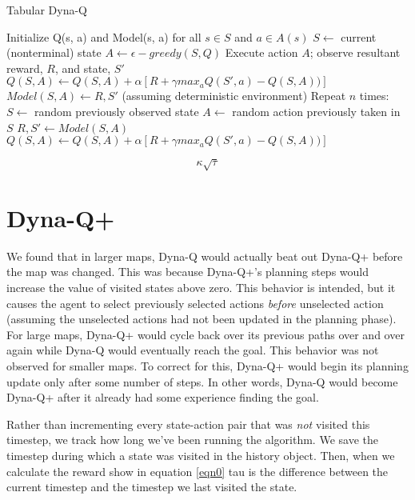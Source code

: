 \begin{algorithm}
    \caption{Tabular Dyna-Q}\label{alg:dynaq}
    \begin{algorithmic}
      \STATE Initialize Q(s, a) and Model(s, a) for all $s \in S$ and $a \in A(s)$
        \STATE $S \leftarrow$ current (nonterminal) state
        \STATE $A \leftarrow \epsilon-greedy(S,Q)$
        \STATE Execute action $A$; observe resultant reward, $R$, and state, $S'$
        \STATE $Q(S,A) \leftarrow Q(S,A) + \alpha[R + \gamma max_a Q(S',a) - Q(S,A))]$
        \STATE $Model(S,A) \leftarrow R,S'$ (assuming deterministic environment)
        \STATE Repeat $n$ times:
        \bindent
          \STATE $S \leftarrow$ random previously observed state
          \STATE $A \leftarrow$ random action previously taken in $S$
          \STATE $R,S' \leftarrow Model(S,A)$
          \STATE $Q(S,A) \leftarrow Q(S,A) + \alpha[R + \gamma max_a Q(S',a) - Q(S,A))]$
        \eindent
      \ENDWHILE
    \end{algorithmic}
  \end{algorithm}


\begin{equation}\label{eqn0}
    \kappa \sqrt{\tau}
\end{equation}


\section{Dyna-Q+}

We found that in larger maps, Dyna-Q would actually beat out Dyna-Q+ before the map was changed. This was because Dyna-Q+'s planning steps would increase the value of visited states above zero. This behavior is intended, but it causes the agent to select previously selected actions \textit{before} unselected action (assuming the unselected actions had not been updated in the planning phase). For large maps, Dyna-Q+ would cycle back over its previous paths over and over again while Dyna-Q would eventually reach the goal. This behavior was not observed for smaller maps. To correct for this, Dyna-Q+ would begin its planning update only after some number of steps. In other words, Dyna-Q would become Dyna-Q+ after it already had some experience finding the goal. 

Rather than incrementing every state-action pair that was \textit{not} visited this timestep, we track how long we've been running the algorithm. We save the timestep during which a state was visited in the history object. Then, when we calculate the reward show in equation \ref{eqn0} tau is the difference between the current timestep and the timestep we last visited the state. 



